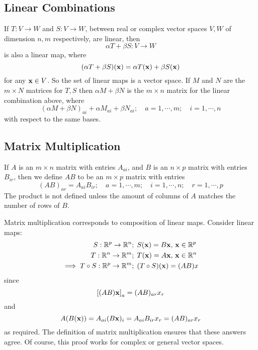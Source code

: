 \subsection{Linear Combinations}
If \(T: V \to W\) and \(S: V \to W\), between real or complex vector spaces \(V, W\) of dimension \(n, m\) respectively, are linear, then
\[
	\alpha T + \beta S: V \to W
\]
is also a linear map, where
\[
	(\alpha T + \beta S)(\vb x) = \alpha T(\vb x) + \beta S(\vb x)
\]
for any \(\vb x \in V\).
So the set of linear maps is a vector space.
If \(M\) and \(N\) are the \(m\times N\) matrices for \(T, S\) then \(\alpha M + \beta N\) is the \(m\times n\) matrix for the linear combination above, where
\[
	(\alpha M + \beta N)_{ai} + \alpha M_{ai} + \beta N_{ai};\quad a = 1, \cdots, m;\quad i = 1, \cdots, n
\]
with respect to the same bases.

\subsection{Matrix Multiplication}
If \(A\) is an \(m\times n\) matrix with entries \(A_{ai}\), and \(B\) is an \(n \times p\) matrix with entries \(B_{ir}\), then we define \(AB\) to be an \(m \times p\) matrix with entries
\[
	(AB)_{ar} = A_{ai}B_{ir};\quad a = 1, \cdots, m;\quad i = 1, \cdots, n;\quad r = 1, \cdots, p
\]
The product is not defined unless the amount of columns of \(A\) matches the number of rows of \(B\).

Matrix multiplication corresponds to composition of linear maps.
Consider linear maps:
\begin{align*}
	S: \mathbb R^p \to \mathbb R^n                  & ;\; S(\vb x) = B \vb x,\, \vb x \in \mathbb R^p \\
	T: \mathbb R^n \to \mathbb R^m                  & ;\; T(\vb x) = A \vb x,\, \vb x \in \mathbb R^n \\
	\implies T \circ S: \mathbb R^p \to \mathbb R^m & ;\; (T\circ S)(\vb x) = (AB)x
\end{align*}
since
\[
	\left[ (AB)\vb x \right]_a = (AB)_{ar}x_r
\]
and
\[
	A(B(\vb x)) = A_{ai} (B\vb x)_i = A_{ai} B_{ir} x_r = (AB)_{ar}x_r
\]
as required.
The definition of matrix multiplication ensures that these answers agree.
Of course, this proof works for complex or general vector spaces.

